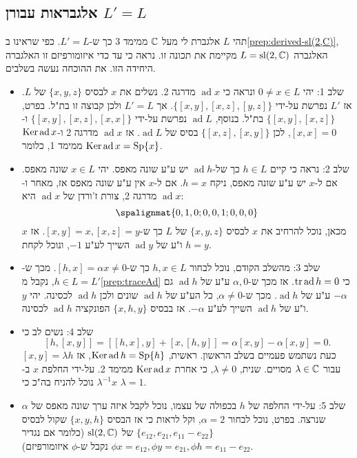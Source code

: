 \documentclass{report}
\theoremstyle{break}
\theoremstyle{MyNonumberbreak}
\DeclareMathOperator{\Sp}{Sp}
\DeclareMathOperator{\ad}{ad} %
\begin{document}
\subsection{אלגבראות עבורן $L' = L$}
תהי $L$ אלגברת לי מעל $\operatorname{\mathbb{C}}$ ממימד 3 כך ש-$L' = L$. כפי שראינו ב\autoref*{prep:derived-sl(2,C)}, האלגברה $L = \operatorname{sl}(2, \operatorname{\mathbb{C}})$ מקיימת את תכונה זו. נראה כי עד כדי איזומורפיזם זו האלגברה היחידה הזו. את ההוכחה נעשה בשלבים.
\begin{itemize}
	\item 
	שלב 1: יהי $0 \neq x \in L$ ונראה כי $\ad x$ מדרגה 2. נשלים את $x$ לבסיס $\{x, y, z\}$ של $L$. אז $L'$ נפרשת על-ידי $\{[x, y], [x, z], [y, z]\}$. אך $L' = L$ ולכן קבוצה זו בת"ל. בפרט, $\{[x, y], [x, z]\}$ בת"ל. בנוסף, $\ad L$ נפרשת על-ידי $\{[x, y], [x, z], [x, x]\}$ ו-$[x, x] = 0$, לכן $\{[x, z], [x, y]\}$ בסיס של $\ad L$. אז $\ad x$ מדרגה 2 ו-$\Ker\ad x$ ממימד 1, כלומר $\Ker\ad x = \Sp\{x\}$.
	\item
	שלב 2: נראה כי קיים $h \in L$ כך של-$\ad h$ יש ע"ע שונה מאפס. יהי $x \in L$ שונה מאפס. אם ל-$x$ יש ע"ע שונה מאפס, ניקח $h = x$. אם ל-$x$ אין ע"ע שונה מאפס אז, מאחר ו-$\ad x$ מדרגה 2, צורת ז'ורדן של $\ad x$ היא:
	\[ \spalignmat{0,1,0;0,0,1;0,0,0} \]
	מכאן, נוכל להרחיב את $x$ לבסיס $\{x, y, z\}$ של $L$ כך ש-$[x, y] = x, [x, z] = y$. אז $x$ ו"ע של $\ad y$ השייך לע"ע $-1$, ונוכל לקחת $h = y$.
	\item
	שלב 3: מהשלב הקודם, נוכל לבחור $h, x \in L$ כך ש-$[h, x] = \alpha x \neq 0$. מכך ש-$h \in L = L'$, נקבל מ\autoref*{prep:traceAd} כי $\Tr\ad h = 0$. אז מכך ש-$\alpha, 0$ ע"ע של $\ad h$ גם $-\alpha$ ע"ע של $\ad h$. מכך ש-$\alpha \neq 0$, כל הע"ע של $\ad h$ שונים ולכן $\ad h$ לכסינה. יהי $y$ ו"ע של $\ad h$ השייך לע"ע $-\alpha$. אז בבסיס $\{x, h, y\}$ הפונקציה $\ad h$ לכסינה.
	\item
	שלב 4: נשים לב כי
	\[ [h, [x, y]] = [[h, x], y] + [x, [h, y]] = \alpha[x, y] - \alpha[x, y] = 0. \]
	כעת נשתמש פעמיים בשלב הראשון. ראשית, $\Ker\ad h = \Sp\{h\}$,  אז $[x, y] = \lambda h$ עבור $\lambda \in \operatorname{\mathbb{C}}$ מסויים. שנית, $\lambda \neq 0$, כי אחרת $\Ker\ad x$ ממימד 2. על-ידי החלפת $x$ ב-$\lambda^{-1}x$ נוכל להניח בה"כ כי $\lambda = 1$.
	\item
	שלב 5: על-ידי החלפה של $h$ בכפולה של עצמו, נוכל לקבל איזה ערך שונה מאפס של $\alpha$ שנרצה. בפרט, נוכל לבחור $\alpha = 2$, וקל לראות כי אז הבסיס $\{x, y, h\}$ שקול לבסיס $\{e_{12}, e_{21}, e_{11}-e_{22}\}$ של $\operatorname{sl}(2, \operatorname{\mathbb{C}})$ (כלומר אם נגדיר $\phi x = e_{12}, \phi y = e_{21}, \phi h = e_{11}-e_{22}$ נקבל ש-$\phi$ איזומורפיזם).
\end{itemize}
\end{document}
